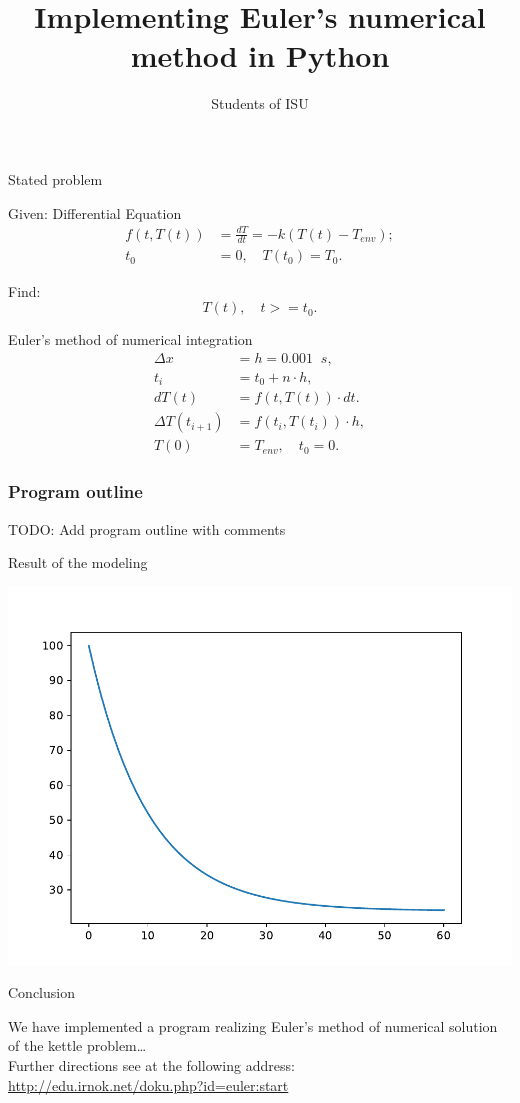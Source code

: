 \documentclass{beamer}
\author{Students of ISU}
\title{Implementing Euler's numerical method in Python}
\begin{document}
\begin{frame}
  \titlepage
\end{frame}

\begin{frame}{Stated problem}

  \begin{block}{Given: Differential Equation}
    \begin{align}
      f(t,T(t)) & = \frac{dT}{dt}=-k(T(t)-T_{env}); \\
      \label{du}
      t_0 & = 0, \quad T(t_0)=T_0.
    \end{align}
  \end{block}

  \begin{block}{Find:}
    \[
      T(t),\quad t>=t_0.
    \]
  \end{block}
\end{frame}
\begin{frame}{Euler's method of numerical integration}
  \begin{align*}
    \Delta x & = h = 0.001\;\; s,\\
    t_i & = t_0 + n\cdot h, \\
    dT(t) & = f(t,T(t))\cdot dt.\\
    \Delta T (t_{i+1}) & = f(t_i,T(t_i))\cdot h,\\
    T(0) & =T_{env},\quad t_0=0.
  \end{align*}
\end{frame}

\begin{frame}
  \frametitle{Program outline}
  TODO: Add program outline with comments
\end{frame}

\begin{frame}{Result of the modeling}
  \begin{center}
  \includegraphics[width=0.8\linewidth]{trajectory.pdf}
\end{center}
\end{frame}
\begin{frame}{Conclusion}

  We have implemented a program realizing Euler's method of numerical solution of the kettle problem\ldots\\[2em]
  Further directions see at the following address:\\
  \url{http://edu.irnok.net/doku.php?id=euler:start}
\end{frame}
\end{document}
